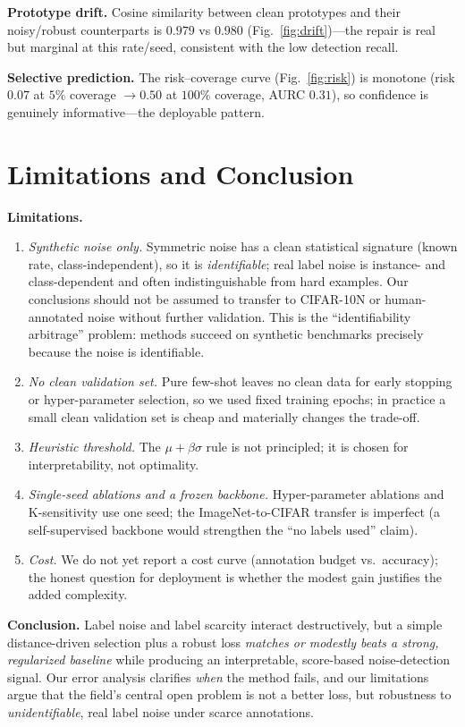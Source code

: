 \documentclass{article}
\begin{document}
\textbf{Prototype drift.} Cosine similarity between clean prototypes and their noisy/robust
counterparts is $0.979$ vs $0.980$ (Fig.~\ref{fig:drift})---the repair is real but marginal at
this rate/seed, consistent with the low detection recall.

\textbf{Selective prediction.} The risk--coverage curve (Fig.~\ref{fig:risk}) is monotone (risk
$0.07$ at $5\%$ coverage $\to 0.50$ at $100\%$ coverage, AURC $0.31$), so confidence is
genuinely informative---the deployable pattern.

\section{Limitations and Conclusion}
\label{sec:conclusion}

\textbf{Limitations.}
\begin{enumerate}
  \item \emph{Synthetic noise only.} Symmetric noise has a clean statistical signature
        (known rate, class-independent), so it is \emph{identifiable}; real label noise is
        instance- and class-dependent and often indistinguishable from hard examples. Our
        conclusions should not be assumed to transfer to CIFAR-10N or human-annotated noise
        without further validation. This is the ``identifiability arbitrage'' problem: methods
        succeed on synthetic benchmarks precisely because the noise is identifiable.
  \item \emph{No clean validation set.} Pure few-shot leaves no clean data for early stopping
        or hyper-parameter selection, so we used fixed training epochs; in practice a small
        clean validation set is cheap and materially changes the trade-off.
  \item \emph{Heuristic threshold.} The $\mu + \beta\sigma$ rule is not principled; it is
        chosen for interpretability, not optimality.
  \item \emph{Single-seed ablations and a frozen backbone.} Hyper-parameter ablations and
        K-sensitivity use one seed; the ImageNet-to-CIFAR transfer is imperfect (a
        self-supervised backbone would strengthen the ``no labels used'' claim).
  \item \emph{Cost.} We do not yet report a cost curve (annotation budget vs.\ accuracy); the
        honest question for deployment is whether the modest gain justifies the added
        complexity.
\end{enumerate}

\textbf{Conclusion.} Label noise and label scarcity interact destructively, but a simple
distance-driven selection plus a robust loss \emph{matches or modestly beats a strong,
regularized baseline} while producing an interpretable, score-based noise-detection signal.
Our error analysis clarifies \emph{when} the method fails, and our limitations argue that the
field's central open problem is not a better loss, but robustness to \emph{unidentifiable},
real label noise under scarce annotations.
\end{document}
